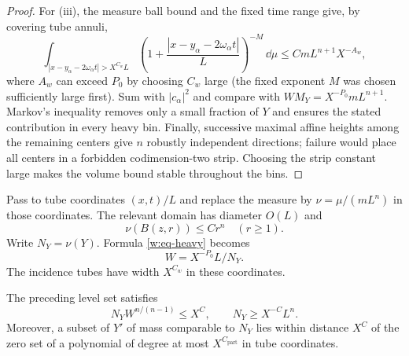 \begin{proof}
For \textup{(iii)}, the measure ball bound and the fixed time range
give, by covering tube annuli,
\[
 \int_{|x-y_\alpha-2\omega_\alpha t|>X^{C_w}L}
 \left(1+\frac{|x-y_\alpha-2\omega_\alpha t|}{L}\right)^{-M}
 \,\dd\mu\leq CmL^{n+1}X^{-A_w},
\]
where $A_w$ can exceed $P_0$ by choosing $C_w$ large (the fixed
exponent $M$ was chosen sufficiently large first).  Sum with
$|c_\alpha|^2$ and compare with $WM_Y=X^{-P_0}mL^{n+1}$.
Markov's inequality removes only a small fraction of $Y$ and ensures
the stated contribution in every heavy bin.  Finally, successive
maximal affine heights among the remaining centers give $n$ robustly
independent directions; failure would place all centers in a forbidden
codimension-two strip.  Choosing the strip constant large makes the
volume bound stable throughout the bins.
\end{proof}

Pass to tube coordinates $(x,t)/L$ and replace the measure by
$\nu=\mu/(mL^n)$ in those coordinates.  The relevant domain has diameter
$O(L)$ and
\[
 \nu(B(z,r))\leq Cr^n\quad(r\geq1).
\]
Write $N_Y=\nu(Y)$.  Formula \eqref{w:eq-heavy} becomes
\begin{equation}\label{w:eq-Wnormalized}
 W=X^{-P_0}L/N_Y.
\end{equation}
The incidence tubes have width $X^{C_w}$ in these coordinates.

\begin{lemma}\label{w:wall}
The preceding level set satisfies
\begin{equation}\label{w:eq-incidence-mass}
 N_YW^{n/(n-1)}\leq X^C,
 \qquad N_Y\geq X^{-C}L^n.
\end{equation}
Moreover, a subset of $Y'$ of mass comparable to $N_Y$ lies within
distance $X^C$ of the zero set of a polynomial of degree at most
$X^{C_{\mathrm{part}}}$ in tube coordinates.
\end{lemma}

